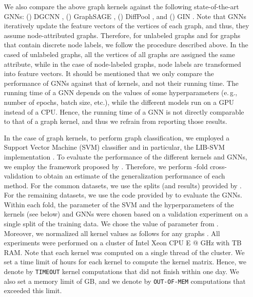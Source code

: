 \documentclass[twoside,11pt]{article}
\newcommand{\eg}{e.\,g., }
\begin{document}
We also compare the above graph kernels against the following  state-of-the-art GNNs: () DGCNN , () GraphSAGE , () DiffPool , and () GIN .
Note that GNNs iteratively update the feature vectors of the vertices of each graph, and thus, they assume node-attributed graphs.
Therefore, for unlabeled graphs and for graphs that contain discrete node labels, we follow the procedure described above.
In the cased of unlabeled graphs, all the vertices of all graphs are assigned the same attribute, while in the case of node-labeled graphs, node labels are transformed into feature vectors.
It should be mentioned that we only compare the performance of GNNs against that of kernels, and not their running time.
The running time of a GNN depends on the values of some hyperparameters (\eg number of epochs, batch size, etc.), while the different models run on a GPU instead of a CPU.
Hence, the running time of a GNN is not directly comparable to that of a graph kernel, and thus we refrain from reporting those results.

In the case of graph kernels, to perform graph classification, we employed a Support Vector Machine (SVM) classifier and in particular, the LIB-SVM implementation .
To evaluate the performance of the different kernels and GNNs, we employ the framework proposed by .
Therefore, we perform -fold cross-validation to obtain an estimate of the generalization performance of each method.
For the common datasets, we use the splits (and results) provided by .
For the remaining datasets, we use the code provided by  to evaluate the  GNNs.
Within each fold, the parameter  of the SVM and the hyperparameters of the kernels (see below) and GNNs were chosen based on a validation experiment on a single  split of the training data.
We chose the value of parameter  from .
Moreover, we normalized all kernel values as follows  for any graphs .
All experiments were performed on a cluster of  Intel\textsuperscript{\textcopyright} Xeon\textsuperscript{\textcopyright} CPU E @ GHz with TB RAM.
Note that each kernel was computed on a single thread of the cluster.
We set a time limit of  hours for each kernel to compute the kernel matrix.
Hence, we denote by \texttt{TIMEOUT} kernel computations that did not finish within one day.
We also set a memory limit of GB, and we denote by \texttt{OUT-OF-MEM} computations that exceeded this limit.
\end{document}
